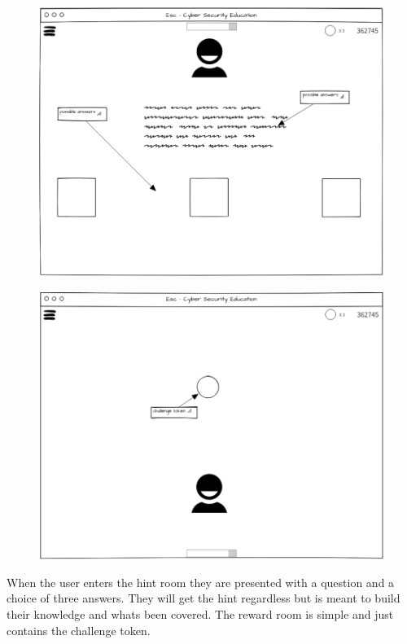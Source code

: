 \documentclass[12pt,a4paper]{article}
\begin{document}
\begin{figure}
\centering
\begin{minipage}{.5\textwidth}
  \centering
  \includegraphics[width=1\linewidth]{Figs/Ui_hint_room.PNG}
  \label{fig:test1}
\end{minipage}%
\begin{minipage}{.5\textwidth}
  \centering
  \includegraphics[width=1\linewidth]{Figs/Ui_reward_room.PNG}
  \label{fig:test2}
\end{minipage}
\end{figure}   

When the user enters the hint room they are presented with a question and a choice of three answers. They will get the hint regardless but is meant to build their knowledge and whats been covered. The reward room is simple and just contains the challenge token.
\end{document}

